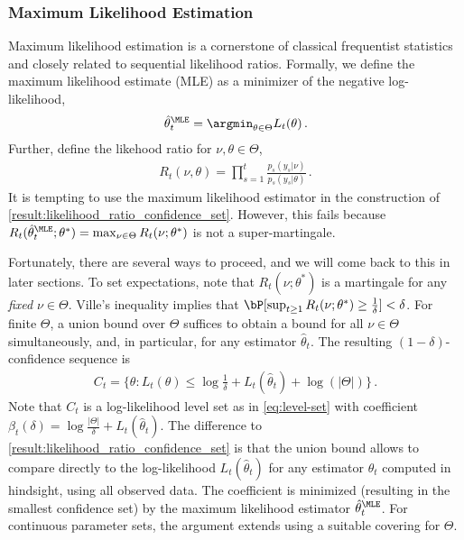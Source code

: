 
\subsubsection{Maximum Likelihood Estimation} \label{sec:mle}
Maximum likelihood estimation is a cornerstone of classical frequentist statistics and closely related to sequential likelihood ratios. Formally, we define the maximum likelihood estimate (MLE)  as a minimizer of the negative log-likelihood,
\begin{align*}
    \hat \theta_t^{\MLE} = \argmin_{\theta \in \Theta} L_t(\theta) \,.
\end{align*}
Further, define the likehood ratio for $\nu, \theta \in \Theta$,
\begin{align} 
    R_t(\nu, \theta) = \prod_{s=1}^t \frac{p_s(y_s|\nu)}{p_s(y_s|\theta)}  \,.\label{eq:two-parameter-ratio}
\end{align}
It is tempting to use the maximum likelihood estimator in the construction of \cref{result:likelihood_ratio_confidence_set}. However, this fails because $R_t(\hat \theta_t^{\MLE}; \theta^*) = \max_{\nu \in \Theta} R_t(\nu; \theta^*)$ is not a super-martingale.

Fortunately, there are several ways to proceed, and we will come back to this in later sections. To set expectations, note that $R_t(\nu;\theta^*)$ is a martingale for any \emph{fixed} $\nu \in \Theta$. Ville's inequality implies that $\bP[\sup_{t \geq 1} R_t(\nu;\theta^*) \geq \frac{1}{\delta}] < \delta$. For finite $\Theta$, a union bound over $\Theta$ suffices to obtain a bound for all $\nu \in \Theta$ simultaneously, and, in particular, for any estimator $\hat \theta_t$. The resulting $(1-\delta)$-confidence sequence is
\begin{align}
C_t = \{ \theta : L_t(\theta) \leq \log \frac{1}{\delta} +  L_t(\hat \theta_t) + \log(|\Theta|) \} \,.
\end{align}
 Note that $C_t$ is a log-likelihood level set as in \cref{eq:level-set} with coefficient $\beta_t(\delta) = \log \frac{|\Theta|}{\delta} +  L_t(\hat \theta_t)$. The difference to \cref{result:likelihood_ratio_confidence_set} is that the union bound allows to compare directly to the log-likelihood $L_t(\hat \theta_t)$ for any estimator $\hat \theta_t$ computed in hindsight, using all observed data. The coefficient is minimized (resulting in the smallest confidence set) by the maximum likelihood estimator $\hat \theta_t^\MLE$. For continuous parameter sets, the argument extends using a suitable covering for $\Theta$. 


